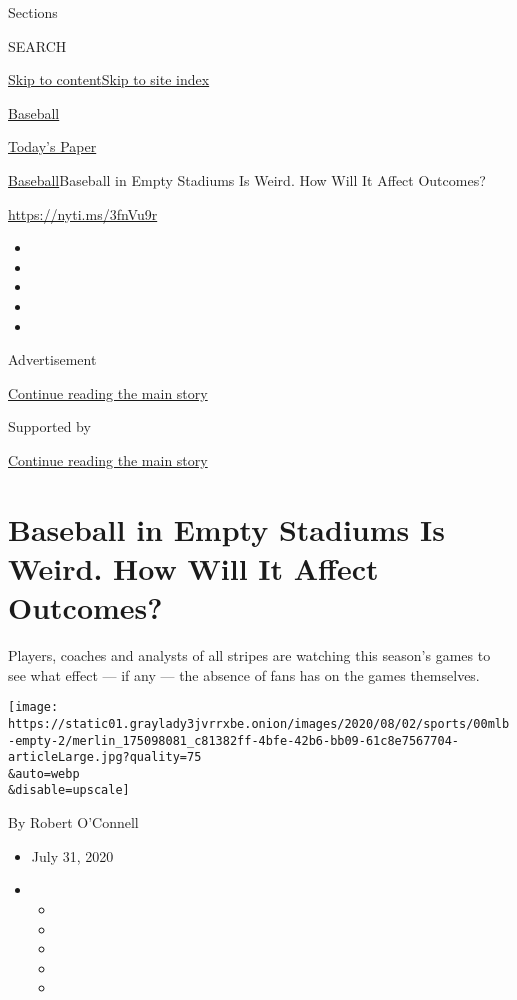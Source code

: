 Sections

SEARCH

\protect\hyperlink{site-content}{Skip to
content}\protect\hyperlink{site-index}{Skip to site index}

\href{https://www.nytimes3xbfgragh.onion/section/sports/baseball}{Baseball}

\href{https://myaccount.nytimes3xbfgragh.onion/auth/login?response_type=cookie\&client_id=vi}{}

\href{https://www.nytimes3xbfgragh.onion/section/todayspaper}{Today's
Paper}

\href{/section/sports/baseball}{Baseball}\textbar{}Baseball in Empty
Stadiums Is Weird. How Will It Affect Outcomes?

\url{https://nyti.ms/3fnVu9r}

\begin{itemize}
\item
\item
\item
\item
\item
\end{itemize}

Advertisement

\protect\hyperlink{after-top}{Continue reading the main story}

Supported by

\protect\hyperlink{after-sponsor}{Continue reading the main story}

\hypertarget{baseball-in-empty-stadiums-is-weird-how-will-it-affect-outcomes}{%
\section{Baseball in Empty Stadiums Is Weird. How Will It Affect
Outcomes?}\label{baseball-in-empty-stadiums-is-weird-how-will-it-affect-outcomes}}

Players, coaches and analysts of all stripes are watching this season's
games to see what effect --- if any --- the absence of fans has on the
games themselves.

\texttt{[image: https://static01.graylady3jvrrxbe.onion/images/2020/08/02/sports/00mlb-empty-2/merlin\_175098081\_c81382ff-4bfe-42b6-bb09-61c8e7567704-articleLarge.jpg?quality=75\\\&auto=webp\\\&disable=upscale]}

By Robert O'Connell

\begin{itemize}
\item
  July 31, 2020
\item
  \begin{itemize}
  \item
  \item
  \item
  \item
  \item
  \end{itemize}
\end{itemize}


